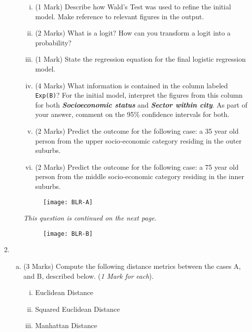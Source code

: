 \begin{enumerate}
\begin{enumerate}[(a)]
\begin{enumerate}[(i)]
\item (1 Mark) Describe how Wald's Test was used to refine the initial model. Make reference to relevant figures in the output.
\item (2 Marks)
What is a logit? How can you transform a logit into a probability?

\item (1 Mark) State the regression equation for the final logistic regression model.
\item (4 Marks) What information is contained in the column labeled \texttt{Exp(B)}? For the initial model, interpret the figures from this column for both \textbf{\textit{Socioeconomic status}} and \textbf{\textit{Sector within city}}. 
As part of your answer, comment on the 95\% confidence intervals for both.


\item (2 Marks) Predict the outcome for the following case: a 35 year old person from the upper socio-economic category residing in the outer suburbs.
\item (2 Marks) Predict the outcome for the following case: a 75 year old person  from the middle socio-economic category residing in the inner suburbs.

\end{enumerate}

\begin{figure}[h!]
	\centering

\texttt{[image: BLR-A]}\\

\end{figure}

\noindent \textit{This question is continued on the next page.}
\begin{figure}[h!]
	\centering

	\texttt{[image: BLR-B]}\\
	
\end{figure}


\end{enumerate}
\newpage


	\item 
	\begin{enumerate}[(a)]
		\item (3 Marks)  Compute the following distance metrics between the cases A, and B, described below. (\textit{1 Mark for each}).
		\begin{enumerate}[(i)]
		\item Euclidean Distance
		\item Squared Euclidean Distance
		\item Manhattan Distance
		

\end{enumerate}
\end{enumerate}
\end{enumerate}
